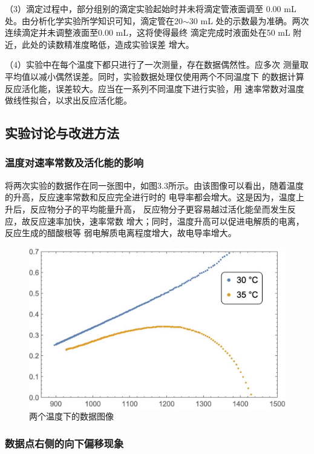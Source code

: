 \documentclass[12pt]{ctexart}
\numberwithin{equation}{section}
\begin{document}
（3）滴定过程中，部分组别的滴定实验起始时并未将滴定管液面调至
0.00 mL 处。由分析化学实验所学知识可知，滴定管在20$\sim$30 mL
处的示数最为准确。两次连续滴定并未调整液面至0.00 mL，这将使得最终
滴定完成时液面处在50 mL 附近，此处的读数精准度略低，造成实验误差
增大。

（4）实验中在每个温度下都只进行了一次测量，存在数据偶然性。应多次
测量取平均值以减小偶然误差。同时，实验数据处理仅使用两个不同温度下
的数据计算反应活化能，误差较大。应当在一系列不同温度下进行实验，用
速率常数对温度做线性拟合，以求出反应活化能。

\subsection{实验讨论与改进方法}
\subsubsection{温度对速率常数及活化能的影响}

将两次实验的数据作在同一张图中，如图3.3所示。由该图像可以看出，随着温度的升高，反应速率常数和反应完全进行时的
电导率都会增大。这是因为，温度上升后，反应物分子的平均能量升高，
反应物分子更容易越过活化能垒而发生反应，故反应速率加快，速率常数
增大；同时，温度升高可以促进电解质的电离，反应生成的醋酸根等
弱电解质电离程度增大，故电导率增大。

\begin{figure}[!h]
    \centering
    \includegraphics[scale=0.67]{inone.jpg}
    \caption{两个温度下的数据图像}
\end{figure}

\subsubsection{数据点右侧的向下偏移现象}
\end{document}
